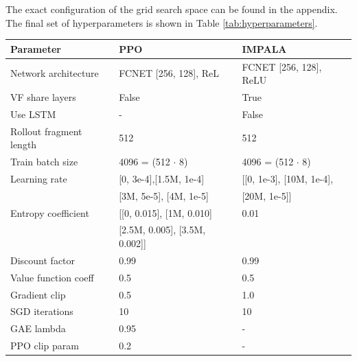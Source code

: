 \documentclass[12pt,a4paper, onecolumn]{exam}
\begin{document}
The exact configuration of the grid search space can be found in the appendix.
The final set of hyperparameters is shown in Table \ref{tab:hyperparameters}.

\begin{table}[h]
    \centering
    \begin{tabular}{|l|l|l|}
        \hline
        \textbf{Parameter}           & \textbf{PPO}                  & \textbf{IMPALA}          \\
        \hline
        Network architecture         & FCNET [256, 128], ReL         & FCNET [256, 128], ReLU   \\
        \hline
        VF share layers              & False                         & True                     \\
        Use LSTM                     & -                             & False                    \\
        \hline
        Rollout fragment length      & 512                           & 512                      \\
        Train batch size             & 4096 = (512 $\cdot$ 8)        & 4096 = (512 $\cdot$ 8)   \\
        \hline
        Learning rate                & [0, 3e-4],[1.5M, 1e-4]        & [[0, 1e-3], [10M, 1e-4], \\
                                     & [3M, 5e-5], [4M, 1e-5]        & [20M, 1e-5]]             \\
        \hline
        Entropy coefficient          & [[0, 0.015],  [1M, 0.010]     & 0.01                     \\
                                     & [2.5M, 0.005], [3.5M, 0.002]] &                          \\
        \hline
        Discount factor              & 0.99                          & 0.99                     \\
        Value function coeff         & 0.5                           & 0.5                      \\
        Gradient clip                & 0.5                           & 1.0                      \\
        SGD iterations               & 10                            & 10                       \\
        \hline
        GAE lambda                   & 0.95                          & -                        \\
        PPO clip param               & 0.2                           & -                        \\

\end{tabular}
\end{table}
\end{document}
